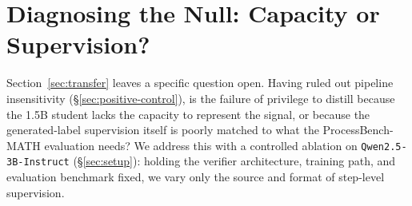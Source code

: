 \documentclass{article}
\begin{document}
\section{Diagnosing the Null: Capacity or Supervision?}
\label{sec:mismatch}

Section~\ref{sec:transfer} leaves a specific question open. Having ruled out
pipeline insensitivity (\S\ref{sec:positive-control}), is the failure of
privilege to distill because the 1.5B student lacks the capacity to
represent the signal, or because the generated-label supervision itself is
poorly matched to what the ProcessBench-MATH evaluation needs? We address
this with a controlled ablation on \texttt{Qwen2.5-3B-Instruct}
(\S\ref{sec:setup}): holding the verifier architecture, training path, and
evaluation benchmark fixed, we vary only the source and format of step-level
supervision.
\end{document}
